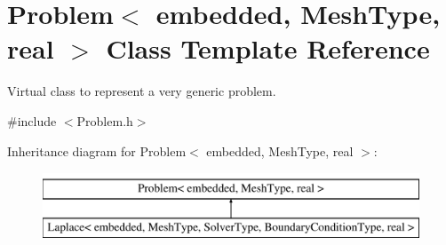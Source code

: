 \hypertarget{class_problem}{\section{\-Problem$<$ embedded, \-Mesh\-Type, real $>$ \-Class \-Template \-Reference}
\label{class_problem}
}


\-Virtual class to represent a very generic problem.  




{\ttfamily \#include $<$\-Problem.\-h$>$}

\-Inheritance diagram for \-Problem$<$ embedded, \-Mesh\-Type, real $>$\-:\begin{figure}[H]
\begin{center}
\leavevmode
\includegraphics[height=2.000000cm]{class_problem}
\end{center}
\end{figure}
